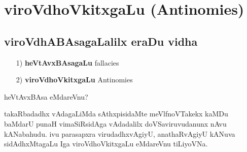 \chapter{viroVdhoVkitxgaLu (\rm Antinomies)}

\section*{viroVdhABAsagaLalilx eraDu vidha}
\begin{itemize}
\item[{\rm 1)}] {\bf heVtAvxBAsagaLu} {\rm fallacies}
\item[{\rm 2)}] {\bf viroVdhoVkitxgaLu} {\rm Antinomies}
\end{itemize}

heVtAvxBAsa eMdareVnu?

takaRbadadhx vAdagaLiMda sAthxpisidaMte meVlfnoVTakekx kaMDu baMdarU punaH vimaSiRsidAga vAdadalilx doVSaviruvudanunx nAvu kANabahudu. ivu parasapxra virudadhxvAgiyU, anathaRvAgiyU kANuva sidAdhxMtagaLu Iga viroVdhoVkitxgaLu eMdareVnu tiLiyoVNa.

